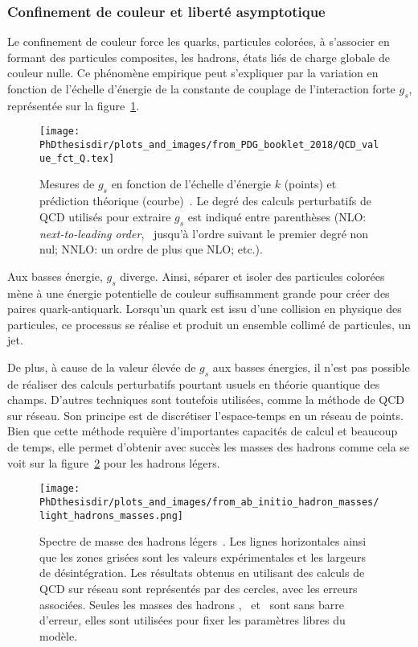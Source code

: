 \subsubsection{Confinement de couleur et liberté asymptotique}\label{chapter-MS-MSSM-section-formalisme-subsec-QCD-subsubsec-confinement}
Le confinement de couleur force les quarks, particules colorées, à s'associer en formant des particules composites, les hadrons, états liés de charge globale de couleur nulle. Ce phénomène empirique peut s'expliquer par la variation en fonction de l'échelle d'énergie de la constante de couplage de l'interaction forte $g_s$, représentée sur la figure~\ref{fig-g_s_fct_energy}.
\begin{figure}[h]
\centering
\texttt{[image: \\PhDthesisdir/plots\_and\_images/from\_PDG\_booklet\_2018/QCD\_value\_fct\_Q.tex]}
\caption[Mesure de $g_s$ en fonction de l'échelle d'énergie.]{Mesures de $g_s$ en fonction de l'échelle d'énergie $k$ (points) et prédiction théorique (courbe)~\cite{PDG_booklet_2018}. Le degré des calculs perturbatifs de QCD utilisés pour extraire $g_s$ est indiqué entre parenthèses (NLO: \emph{next-to-leading order}, \ie\ jusqu'à l'ordre suivant le premier degré non nul; NNLO: un ordre de plus que NLO; etc.).}
\label{fig-g_s_fct_energy}
\end{figure}
\par Aux basses énergie, $g_s$ diverge.
Ainsi, séparer et isoler des particules colorées mène à une énergie potentielle de couleur suffisamment grande pour créer des paires quark-antiquark. Lorsqu'un quark est issu d'une collision en physique des particules, ce processus se réalise et produit un ensemble collimé de particules, un jet.
\par De plus, à cause de la valeur élevée de $g_s$ aux basses énergies, il n'est pas possible de réaliser des calculs perturbatifs pourtant usuels en théorie quantique des champs.
D'autres techniques sont toutefois utilisées, comme la méthode de QCD sur réseau. Son principe est de discrétiser l'espace-temps en un réseau de points. Bien que cette méthode requière d'importantes capacités de calcul et beaucoup de temps, elle permet d'obtenir avec succès les masses des hadrons comme cela se voit sur la figure~\ref{fig-lattice_QCD_masses} pour les hadrons légers.
\begin{figure}[h]
\centering
\texttt{[image: \\PhDthesisdir/plots\_and\_images/from\_ab\_initio\_hadron\_masses/light\_hadrons\_masses.png]}
\caption[Spectre de masse des hadrons légers.]{Spectre de masse des hadrons légers~\cite{ab_initio_hadron_masses}. Les lignes horizontales ainsi que les zones grisées sont les valeurs expérimentales et les largeurs de désintégration. Les résultats obtenus en utilisant des calculs de QCD sur réseau sont représentés par des cercles, avec les erreurs associées. Seules les masses des hadrons \pion, \Kaon\ et \Xibaryon\ sont sans barre d'erreur, elles sont utilisées pour fixer les paramètres libres du modèle.}
\label{fig-lattice_QCD_masses}
\end{figure}
